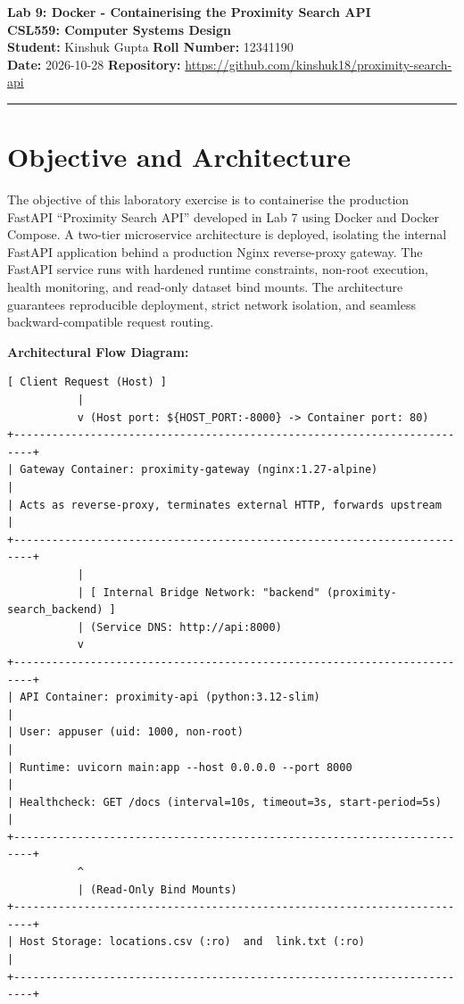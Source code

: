 \documentclass[10pt,a4paper]{article}
\begin{document}
\begin{center}
    {\Large \textbf{Lab 9: Docker - Containerising the Proximity Search API}}\\[0.4em]
    {\normalsize \textbf{CSL559: Computer Systems Design}}\\[0.3em]
    \textbf{Student:} Kinshuk Gupta \quad\textbar\quad \textbf{Roll Number:} 12341190\\[0.2em]
    \textbf{Date:} 2026-10-28 \quad\textbar\quad \textbf{Repository:} \url{https://github.com/kinshuk18/proximity-search-api}\\[0.8em]
\end{center}

\hrule
\vspace{0.8em}

\section{Objective and Architecture}

The objective of this laboratory exercise is to containerise the production FastAPI ``Proximity Search API'' developed in Lab 7 using Docker and Docker Compose. A two-tier microservice architecture is deployed, isolating the internal FastAPI application behind a production Nginx reverse-proxy gateway. The FastAPI service runs with hardened runtime constraints, non-root execution, health monitoring, and read-only dataset bind mounts. The architecture guarantees reproducible deployment, strict network isolation, and seamless backward-compatible request routing.

\vspace{0.4em}
\noindent
\textbf{Architectural Flow Diagram:}
\begin{lstlisting}
[ Client Request (Host) ]
           |
           v (Host port: ${HOST_PORT:-8000} -> Container port: 80)
+-------------------------------------------------------------------------+
| Gateway Container: proximity-gateway (nginx:1.27-alpine)               |
| Acts as reverse-proxy, terminates external HTTP, forwards upstream      |
+-------------------------------------------------------------------------+
           |
           | [ Internal Bridge Network: "backend" (proximity-search_backend) ]
           | (Service DNS: http://api:8000)
           v
+-------------------------------------------------------------------------+
| API Container: proximity-api (python:3.12-slim)                         |
| User: appuser (uid: 1000, non-root)                                     |
| Runtime: uvicorn main:app --host 0.0.0.0 --port 8000                    |
| Healthcheck: GET /docs (interval=10s, timeout=3s, start-period=5s)      |
+-------------------------------------------------------------------------+
           ^
           | (Read-Only Bind Mounts)
+-------------------------------------------------------------------------+
| Host Storage: locations.csv (:ro)  and  link.txt (:ro)                 |
+-------------------------------------------------------------------------+
\end{lstlisting}
\end{document}
